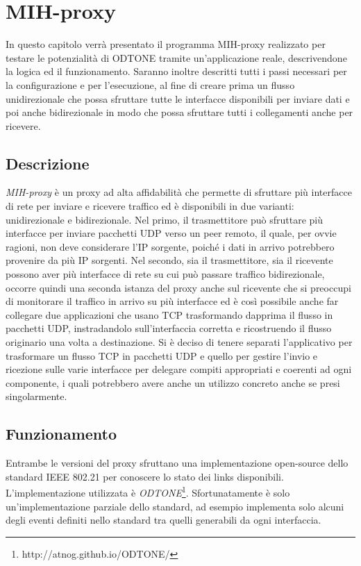 \chapter{MIH-proxy}
In questo capitolo verrà presentato il programma MIH-proxy realizzato per testare le potenzialità di ODTONE tramite un'applicazione reale, descrivendone la logica ed il funzionamento. Saranno inoltre descritti tutti i passi necessari per la configurazione e per l'esecuzione, al fine di creare prima un flusso unidirezionale che possa sfruttare tutte le interfacce disponibili per inviare dati e poi anche bidirezionale in modo che possa sfruttare tutti i collegamenti anche per ricevere.

\section{Descrizione}
{\em MIH-proxy} è un proxy ad alta affidabilità che permette di sfruttare più interfacce di rete per inviare e ricevere traffico ed è disponibili in due varianti: unidirezionale e bidirezionale. Nel primo, il trasmettitore può sfruttare più interfacce per inviare pacchetti UDP verso un peer remoto, il quale, per ovvie ragioni, non deve considerare l'IP sorgente, poiché i dati in arrivo potrebbero provenire da più IP sorgenti. Nel secondo, sia il trasmettitore, sia il ricevente possono aver più interfacce di rete su cui può passare traffico bidirezionale, occorre quindi una seconda istanza del proxy anche sul ricevente che si preoccupi di monitorare il traffico in arrivo su più interfacce ed è così possibile anche far collegare due applicazioni che usano TCP trasformando dapprima il flusso in pacchetti UDP, instradandolo sull'interfaccia corretta e ricostruendo il flusso originario una volta a destinazione. Si è deciso di tenere separati l'applicativo per trasformare un flusso TCP in pacchetti UDP e quello per gestire l'invio e ricezione sulle varie interfacce per delegare compiti appropriati e coerenti ad ogni componente, i quali potrebbero avere anche un utilizzo concreto anche se presi singolarmente.
\section{Funzionamento}
Entrambe le versioni del proxy sfruttano una implementazione open-source dello standard IEEE 802.21 per conoscere lo stato dei links disponibili. L'implementazione utilizzata è {\em ODTONE}\footnote{http://atnog.github.io/ODTONE/}. Sfortunatamente è solo un'implementazione parziale dello standard, ad esempio implementa solo alcuni degli eventi definiti nello standard tra quelli generabili da ogni interfaccia.\\

